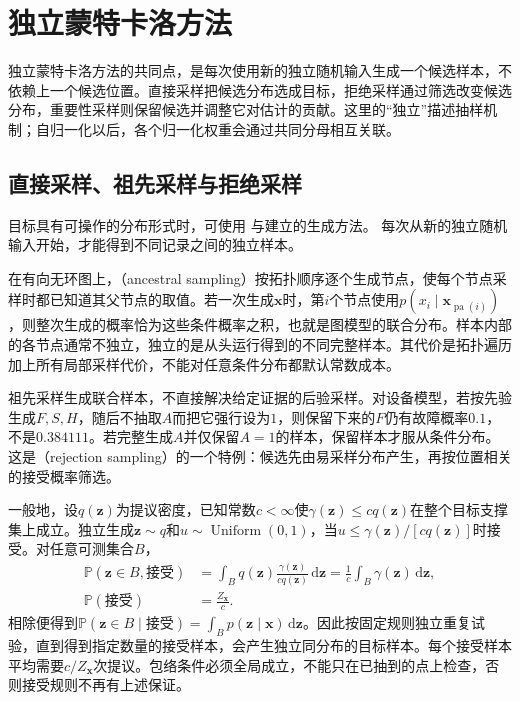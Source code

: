 \section{独立蒙特卡洛方法}
\label{sec:pgm-sampling-independent}

独立蒙特卡洛方法的共同点，是每次使用新的独立随机输入生成一个候选样本，不依赖上一个候选位置。直接采样把候选分布选成目标，拒绝采样通过筛选改变候选分布，重要性采样则保留候选并调整它对估计的贡献。这里的“独立”描述抽样机制；自归一化以后，各个归一化权重会通过共同分母相互关联。

\subsection{直接采样、祖先采样与拒绝采样}
\label{sec:pgm-sampling-direct-rejection}

目标具有可操作的分布形式时，可使用
与建立的生成方法。
每次从新的独立随机输入开始，才能得到不同记录之间的独立样本。

在有向无环图上，（ancestral sampling）按拓扑顺序逐个生成节点，使每个节点采样时都已知道其父节点的取值。若一次生成$\bm{x}$时，第$i$个节点使用$p(x_i\mid\bm{x}_{\operatorname{pa}(i)})$，则整次生成的概率恰为这些条件概率之积，也就是图模型的联合分布。样本内部的各节点通常不独立，独立的是从头运行得到的不同完整样本。其代价是拓扑遍历加上所有局部采样代价，不能对任意条件分布都默认常数成本。

祖先采样生成联合样本，不直接解决给定证据的后验采样。对设备模型，若按先验生成$F,S,H$，随后不抽取$A$而把它强行设为$1$，则保留下来的$F$仍有故障概率$0.1$，不是$0.384111$。若完整生成$A$并仅保留$A=1$的样本，保留样本才服从条件分布。这是（rejection sampling）的一个特例：候选先由易采样分布产生，再按位置相关的接受概率筛选。

一般地，设$q(\bm{z})$为提议密度，已知常数$c<\infty$使$\gamma(\bm{z})\leq c q(\bm{z})$在整个目标支撑集上成立。独立生成$\bm{z}\sim q$和$u\sim\operatorname{Uniform}(0,1)$，当$u\leq\gamma(\bm{z})/[c q(\bm{z})]$时接受。对任意可测集合$B$，
\begin{equation}
  \begin{aligned}
    \mathbb{P}(\bm{z}\in B,\text{接受})
      &=\int_B q(\bm{z})\frac{\gamma(\bm{z})}{c q(\bm{z})}
        \,\mathrm{d}\bm{z}
        =\frac{1}{c}\int_B\gamma(\bm{z})\,\mathrm{d}\bm{z},\\
    \mathbb{P}(\text{接受})&=\frac{Z_{\bm{x}}}{c}.
  \end{aligned}
  \label{eq:pgm-sampling-rejection}
\end{equation}
相除便得到$\mathbb{P}(\bm{z}\in B\mid\text{接受})=\int_B p(\bm{z}\mid\bm{x})\,\mathrm{d}\bm{z}$。因此按固定规则独立重复试验，直到得到指定数量的接受样本，会产生独立同分布的目标样本。每个接受样本平均需要$c/Z_{\bm{x}}$次提议。包络条件必须全局成立，不能只在已抽到的点上检查，否则接受规则不再有上述保证。

